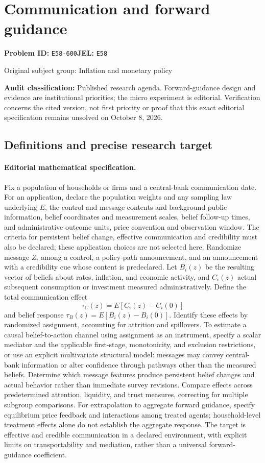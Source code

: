 \documentclass[11pt,a4paper]{article}
\begin{document}
\section*{Communication and forward guidance}
\textbf{Problem ID:} \texttt{E58-600}\quad \textbf{JEL:} \texttt{E58}\par
\label{problem:OP-0250}
{\sffamily\small\color{muted}Original subject group: Inflation and monetary policy\par}
\label{definitions:problem:30007531}
\textbf{Audit classification:} Published research agenda. Forward-guidance design and evidence are institutional priorities; the micro experiment is editorial. Verification concerns the cited version, not first priority or proof that this exact editorial specification remains unsolved on October 8, 2026.
\subsection*{Definitions and precise research target}
\paragraph{Editorial mathematical specification.} Fix a population of households or firms and a central-bank communication date. For an application, declare the population weights and any sampling law underlying \(E\), the control and message contents and background public information, belief coordinates and measurement scales, belief follow-up times, and administrative outcome units, price convention and observation window. The criteria for persistent belief change, effective communication and credibility must also be declared; these application choices are not selected here. Randomize message \(Z_i\) among a control, a policy-path announcement, and an announcement with a credibility cue whose content is predeclared. Let \(B_i(z)\) be the resulting vector of beliefs about rates, inflation, and economic activity, and \(C_i(z)\) actual subsequent consumption or investment measured administratively. Define the total communication effect
\[
\tau_C(z)=E[C_i(z)-C_i(0)]
\]
and belief response \(\tau_B(z)=E[B_i(z)-B_i(0)]\). Identify these effects by randomized assignment, accounting for attrition and spillovers. To estimate a causal belief-to-action channel using assignment as an instrument, specify a scalar mediator and the applicable first-stage, monotonicity, and exclusion restrictions, or use an explicit multivariate structural model: messages may convey central-bank information or alter confidence through pathways other than the measured beliefs.
Determine which message features produce persistent belief changes and actual behavior rather than immediate survey revisions. Compare effects across predetermined attention, liquidity, and trust measures, correcting for multiple subgroup comparisons. For extrapolation to aggregate forward guidance, specify equilibrium price feedback and interactions among treated agents; household-level treatment effects alone do not establish the aggregate response. The target is effective and credible communication in a declared environment, with explicit limits on transportability and mediation, rather than a universal forward-guidance coefficient.
\end{document}

